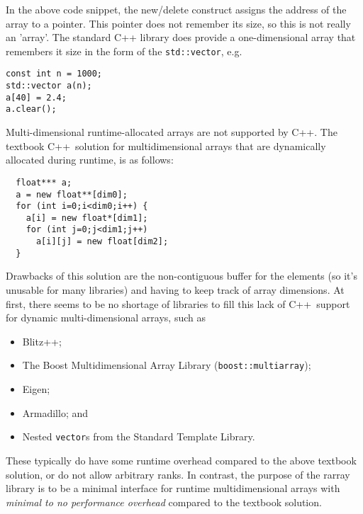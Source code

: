 \documentclass[11pt,twoside]{article}
\newcommand{\cxx}{C{++}}
\begin{document}
In the above code snippet, the new/delete construct assigns the address of the array to a pointer. This pointer does not remember its size, so this is not really an 'array'.  The standard C++ library does provide a one-dimensional array that remembers it size in the form of the \texttt{std::vector}, e.g.
\vspace{-5pt}\begin{framed}\vspace{-14pt}%
\begin{verbatim}
const int n = 1000;
std::vector a(n);
a[40] = 2.4;
a.clear();
\end{verbatim}%
\vspace{-12pt}\end{framed}\vspace{-5pt}%

Multi-dimensional runtime-allocated arrays are not supported by \cxx.
The textbook \cxx\ solution for multidimensional arrays that are
dynamically allocated during runtime, is as follows:
\vspace{-5pt}\begin{framed}\vspace{-14pt}%
\begin{verbatim}
  float*** a;
  a = new float**[dim0];
  for (int i=0;i<dim0;i++) {
    a[i] = new float*[dim1];
    for (int j=0;j<dim1;j++) 
      a[i][j] = new float[dim2];
  }
\end{verbatim}%
\vspace{-12pt}\end{framed}\vspace{-5pt}%
Drawbacks of this solution are the non-contiguous buffer for the
elements (so it's unusable for many libraries) and having to keep
track of array dimensions.
At first, there seems to be no shortage of libraries to fill this
lack of \cxx\ support for dynamic multi-dimensional arrays, such as
\begin{itemize}\itemsep 0pt \parskip 0pt
\item Blitz++;
\item The Boost Multidimensional Array Library (\texttt{boost::multiarray}); 
\item Eigen;
\item Armadillo; and
\item Nested \texttt{vector}s from the Standard Template Library.
\end{itemize}
These typically do have some runtime overhead compared to the above
textbook solution, or do not allow arbitrary ranks. In contrast, the purpose of the rarray
library is to be a minimal interface for runtime multidimensional arrays with
\emph{minimal to no performance overhead} compared to the textbook solution.
\end{document}
